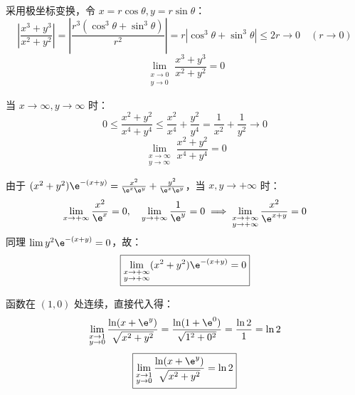 \begin{solution}
    采用极坐标变换，令 $x = r \cos \theta, y = r \sin \theta$：
    \begin{equation}
        \left| \frac{x^3 + y^3}{x^2 + y^2} \right| = \left| \frac{r^3(\cos^3 \theta + \sin^3 \theta)}{r^2} \right| = r |\cos^3 \theta + \sin^3 \theta| \le 2r \to 0 \quad (r \to 0)
    \end{equation}
    \begin{equation}
        \boxed{\lim_{\substack{x \to 0 \\ y \to 0}} \frac{x^3 + y^3}{x^2 + y^2} = 0}
    \end{equation}

    当 $x \to \infty, y \to \infty$ 时：
    \begin{equation}
        0 \le \frac{x^2 + y^2}{x^4 + y^4} \le \frac{x^2}{x^4} + \frac{y^2}{y^4} = \frac{1}{x^2} + \frac{1}{y^2} \to 0
    \end{equation}
    \begin{equation}
        \boxed{\lim_{\substack{x \to \infty \\ y \to \infty}} \frac{x^2 + y^2}{x^4 + y^4} = 0}
    \end{equation}

    由于 $(x^2 + y^2) \e^{-(x+y)} = \frac{x^2}{\e^x \e^y} + \frac{y^2}{\e^x \e^y}$，当 $x, y \to +\infty$ 时：
    \begin{equation}
        \lim_{x \to +\infty} \frac{x^2}{\e^x} = 0, \quad \lim_{y \to +\infty} \frac{1}{\e^y} = 0 \implies \lim_{\substack{x \to +\infty \\ y \to +\infty}} \frac{x^2}{\e^{x+y}} = 0
    \end{equation}
    同理 $\lim y^2 \e^{-(x+y)} = 0$，故：
    \begin{equation}
        \boxed{\lim_{\substack{x \to +\infty \\ y \to +\infty}} (x^2 + y^2) \e^{-(x+y)} = 0}
    \end{equation}

    函数在 $(1, 0)$ 处连续，直接代入得：
    \begin{equation}
        \lim_{\substack{x \to 1 \\ y \to 0}} \frac{\ln (x + \e^y)}{\sqrt{x^2 + y^2}} = \frac{\ln(1 + \e^0)}{\sqrt{1^2 + 0^2}} = \frac{\ln 2}{1} = \ln 2
    \end{equation}
    \begin{equation}
        \boxed{\lim_{\substack{x \to 1 \\ y \to 0}} \frac{\ln (x + \e^y)}{\sqrt{x^2 + y^2}} = \ln 2}
    \end{equation}


\end{solution}
